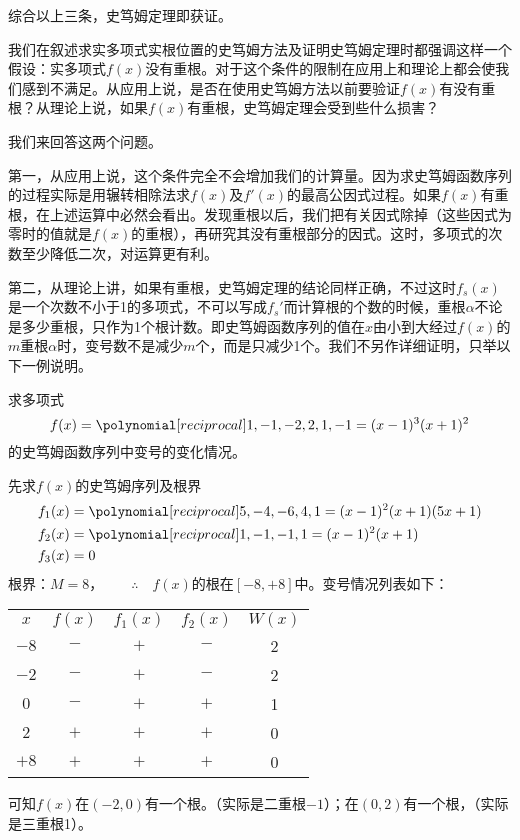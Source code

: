 综合以上三条，史笃姆定理即获证。

我们在叙述求实多项式实根位置的史笃姆方法及证明史笃姆定理时都强调这样一个假设：实多项式$f(x)$没有重根。对于这个条件的限制在应用上和理论上都会使我们感到不满足。从应用上说，是否在使用史笃姆方法以前要验证$f(x)$有没有重根？从理论上说，如果$f(x)$有重根，史笃姆定理会受到些什么损害？

我们来回答这两个问题。

第一，从应用上说，这个条件完全不会增加我们的计算量。因为求史笃姆函数序列的过程实际是用辗转相除法求$f(x)$及$f'(x)$的最高公因式过程。如果$f(x)$有重根，在上述运算中必然会看出。发现重根以后，我们把有关因式除掉（这些因式为零时的值就是$f(x)$的重根），再研究其没有重根部分的因式。这时，多项式的次数至少降低二次，对运算更有利。

第二，从理论上讲，如果有重根，史笃姆定理的结论同样正确，不过这时$f_s(x)$是一个次数不小于1的多项式，不可以写成$f_s'$而计算根的个数的时候，重根$\alpha$不论是多少重根，只作为1个根计数。即史笃姆函数序列的值在$x$由小到大经过$f(x)$的$m$重根$\alpha$时，变号数不是减少$m$个，而是只减少1个。我们不另作详细证明，只举以下一例说明。

\begin{example}
求多项式
\[f(x)=\poly{1,-1,-2,2,1,-1}=(x-1)^3(x+1)^2\]
的史笃姆函数序列中变号的变化情况。
\end{example}

\begin{solution}
先求$f(x)$的史笃姆序列及根界
\[\begin{split}
    f_1(x)&=\poly{5,-4,-6,4,1}=(x-1)^2(x+1)(5x+1)\\
    f_2(x)&=\poly{1,-1,-1,1}=(x-1)^2(x+1)\\
    f_3(x)&=0
\end{split}
    \]
根界：$M=8$，$\qquad \therefore\quad f(x)$的根在$[-8,+8]$中。变号情况列表如下：
\begin{center}
    \begin{tabular}{ccccc}
$x$ & $f(x)$ & $f_1(x)$ & $f_2(x)$ &  $W(x)$\\
$-8$ & $-$ & $+$ &$-$&2\\
$-2$ &$-$ & $+$ &$-$&2\\
$0$ & $-$ & $+$ &$+$&1\\
$2$ &  $+$ & $+$ &$+$&0\\
$+8$ &  $+$ & $+$ &$+$&0\\
    \end{tabular}
\end{center}

可知$f(x)$在$(-2, 0)$有一个根。（实际是二重根$-1$）；在$(0, 2)$有一个根，（实际是三重根1）。
\end{solution}


